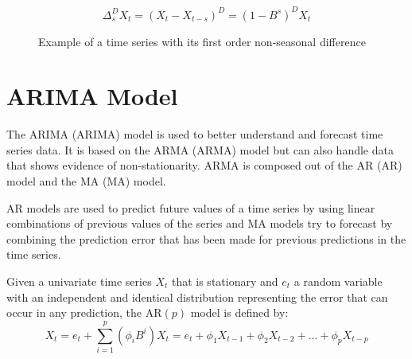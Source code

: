 \begin{equation}\label{eq:seasonal_difference}
\Delta_s^D X_t = (X_t - X_{t-s})^D = (1-B^s)^DX_t
\end{equation}

\begin{figure}[ht]
	\centering
	\caption{Example of a time series with its first order non-seasonal difference}
	\label{fig:example_seasonal_diff}
\end{figure}



\section{ARIMA Model}
The \acl{ARIMA} (\acs{ARIMA}) model is used to better understand and forecast time series data. It is based on the \acl{ARMA} (\acs{ARMA}) model but can also handle data that shows evidence of non-stationarity.  
\acs{ARMA} is composed out of the \acl{AR} (\acs{AR}) model and the \acl{MA} (\acs{MA}) model.

\acl{AR} models are used to predict future values of a time series by using linear combinations of previous values of the series and \acl{MA} models try to forecast by combining the prediction error that has been made for previous predictions in the time series.

Given a univariate time series \(X_t\) that is stationary and \(e_t\) a random variable with an independent and identical distribution representing the error that can occur in any prediction, the \acs{AR}\((p)\) model is defined by:
\begin{equation}\label{eq:AR_p}
X_t = e_t + \displaystyle\sum_{i=1}^{p} (\phi_i B^i) X_t = e_t + \phi_1 X_{t-1}+ \phi_2 X_{t-2}+ ... + \phi_p X_{t-p}
\end{equation}

